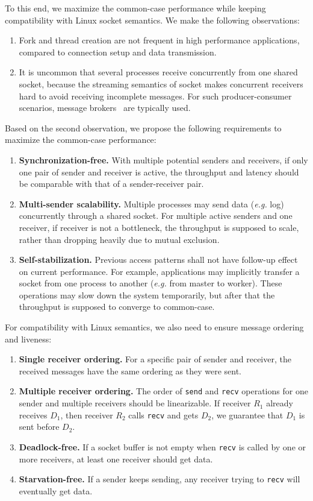To this end, we maximize the common-case performance while keeping compatibility with Linux socket semantics.
We make the following observations:
\begin{enumerate}
	\item Fork and thread creation are not frequent in high performance applications, compared to connection setup and data transmission.
	\item It is uncommon that several processes receive concurrently from one shared socket, because the streaming semantics of socket makes concurrent receivers hard to avoid receiving incomplete messages. For such producer-consumer scenarios, message brokers~\cite{hintjens2013zeromq,rabbitmq2017rabbitmq,kreps2011kafka} are typically used.
\end{enumerate}

Based on the second observation, we propose the following requirements to maximize the common-case performance:
\begin{enumerate}
 \item \textbf{Synchronization-free.} With multiple potential senders and receivers, if only one pair of sender and receiver is active, the throughput and latency should be comparable with that of a sender-receiver pair.
 \item \textbf{Multi-sender scalability.} Multiple processes may send data (\textit{e.g.} log) concurrently through a shared socket. For multiple active senders and one receiver, if receiver is not a bottleneck, the throughput is supposed to scale, rather than dropping heavily due to mutual exclusion.
 \item \textbf{Self-stabilization.} Previous access patterns shall not have follow-up effect on current performance. For example, applications may implicitly transfer a socket from one process to another (\textit{e.g.} from master to worker). These operations may slow down the system temporarily, but after that the throughput is supposed to converge to common-case.
\end{enumerate}

For compatibility with Linux semantics, we also need to ensure message ordering and liveness:
\begin{enumerate}
\item \textbf{Single receiver ordering.} For a specific pair of sender and receiver, the received messages have the same ordering as they were sent.
\item \textbf{Multiple receiver ordering.} The order of \texttt{send} and \texttt{recv} operations for one sender and multiple receivers should be linearizable. If receiver $R_1$ already receives $D_1$, then receiver $R_2$ calls \texttt{recv} and gets $D_2$, we guarantee that $D_1$ is sent before $D_2$.
\item \textbf{Deadlock-free.} If a socket buffer is not empty when \texttt{recv} is called by one or more receivers, at least one receiver should get data.
\item \textbf{Starvation-free.} If a sender keeps sending, any receiver trying to \texttt{recv} will eventually get data.
\end{enumerate}


